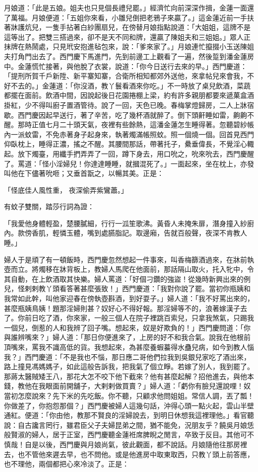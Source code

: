 月娘道：「此是五娘。姐夫也只見個長禮兒罷。」經濟忙向前深深作揖，金蓮一面還了萬福。月娘便道：「五姐你來看，小雛兒倒把老鴉子來贏了。」這金蓮近前一手扶著牀護炕兒，一隻手拈著白紗團扇兒，在傍替月娘指點說道：「大姐姐，這牌不是這等出了。把雙三搭過來，卻不是天不同和牌，還贏了陳姐夫和三姐姐。」眾人正抹牌在熱鬧處，只見玳安抱進毡包來，說：「爹來家了。」月娘連忙攛掇小玉送陳姐夫打角門出去了。西門慶下馬進門，先到前邊工上觀看了一遍，然後踅到潘金蓮房中。金蓮慌忙接著，與他脫了衣裳，說道：「你今日送行去來的早。」西門慶道：「提刑所賀千戶新陞、新平寨知寨，合衛所相知都郊外送他，來拿帖兒來會我，不好不去的。」金蓮道：「你沒酒，教丫鬟看酒來你吃。」不一時放了桌兒飲酒，菜蔬都擺在面前。飲酒中間，因說起後日花園捲棚上梁，約有許多親朋都要來遞菓盒酒掛紅，少不得叫廚子置酒管待。說了一回，天色已晚。春梅掌燈歸房，二人上牀宿歇。西門慶因起早送行，著了辛苦，吃了幾杯酒就醉了。倒下頭鼾睡如雷，齁齁不醒。那時正值七月二十頭天氣，夜裡有些餘熱，這潘金蓮怎生睡得著。忽聽碧紗帳內一派蚊雷，不免赤著身子起身來，執著燭滿帳照蚊。照一個燒一個。回首見西門仰臥枕上，睡得正濃，搖之不醒。其腰間那話，帶著托子，纍垂偉長，不覺淫心輙起。放下燭臺，用纖手捫弄弄了一回，蹲下身去，用口吮之，吮來吮去，西門慶醒了。罵道：「怪小淫婦兒！你達達睡睡，就摑混死了。」一面起來，坐在枕上，亦發叫他在下儘著吮咂；又垂首翫之，以暢其美。正是：

「怪底佳人風性重，  夜深偷弄紫鸞蕭。」

有蚊子雙關，踏莎行詞為證：

「我愛他身體輕盈，楚腰膩細，行行一泒笙歌沸。黃昏人未掩朱扉，潛身撞入紗廚內。款傍香肌，輕憐玉體，嘴到處臙脂記。取邊廂，告就百般聲，夜深不肯教人睡。」

婦人于是頑了有一頓飯時，西門慶忽然想起一件事來，叫香梅篩酒過來，在牀前執壺而立。將燭移在牀背板上，教婦人馬爬在他面前，那話隔山取火，托入牝中，令其自動，在上飲酒取其快樂。婦人罵道：「好個刁鑽的強盜！從幾時新興出來的例兒，怪剌剌教丫頭看答著甚麼張致！」西門慶道：「我對你說了罷。當初你瓶姨和我常如此幹，叫他家迎春在傍執壺斟酒，到好耍子。」婦人道：「我不好罵出來的，甚麼瓶姨鳥姨！題那淫婦則甚？奴好心不得好報。那淫婦等不的，浪著嫁漢子去了。你前日吃了酒，你來家，一般三個人在院子裡跳百索兒，只拿我煞氣，只踢我一個兒，倒惹的人和我辨了回子嘴。想起來，奴是好欺負的！」西門慶問道：「你與誰辨嘴來？」婦人道：「那日你便進來了，上房的好不和我合氣。說我在他根前頂嘴來，罵我不識高低的貨。我想起來，為甚麼養蝦蟇得水蠱兒病，如今到教人惱我？」西門慶道：「不是我也不惱，那日應二哥他們拉我到吳銀兒家吃了酒出來，路上撞見馮媽媽子，如此這般告訴我，把我氣了個立睜。若嫁了別人，我到罷了。那蔣太醫賊矮王八，那花大怎不咬下他下截來？他有甚麼起解？招他進去，與他本錢，教他在我眼面前開舖子，大剌剌做買賣？」婦人道：「虧你有臉兒還說哩！奴當初怎麼說來？先下米的先吃飯。你不聽，只顧求他問姐姐。常信人調，丟了瓢！你做差了，你抱怨那個？」西門慶被婦人這幾句話，沖得心頭一點火起，雲山半壁通紅。便道：「你由他，教那不賢良的淫婦說去，到明日休想我這裡理他。」看官聽說：自古讒言罔行，雖君臣父子夫婦昆弟之間，猶不能免，況朋友乎？饒吳月娘恁般賢淑的婦人，居于正室，西門慶聽金蓮袵席脾睨之閒言，卒致于反目。其他可不慎哉！自是以後，西門慶與月娘尚氣，彼此觀面，都不說話。月娘隨他往那房裡去，也不管他來遲去早，也不問他。或是他進房中取東取西，只教丫頭上前答應，也不理他，兩個都把心來冷淡了。正是：

